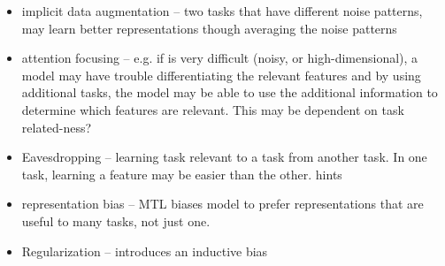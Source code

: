 \begin{itemize}[noitemsep,topsep=0pt]
	\item implicit data augmentation -- two tasks that have different noise patterns, may learn better representations though averaging the noise patterns
	\item attention focusing -- e.g. if is very difficult (noisy, or high-dimensional), a model may have trouble differentiating the relevant features and by using additional tasks, the model may be able to use the additional information to determine which features are relevant. This may be dependent on task related-ness?
	\item Eavesdropping -- learning task relevant to a task from another task. In one task, learning a feature may be easier than the other. hints 
	\item representation bias -- MTL biases model to prefer representations that are useful to many tasks, not just one. 
	\item Regularization -- introduces an inductive bias
\end{itemize}


